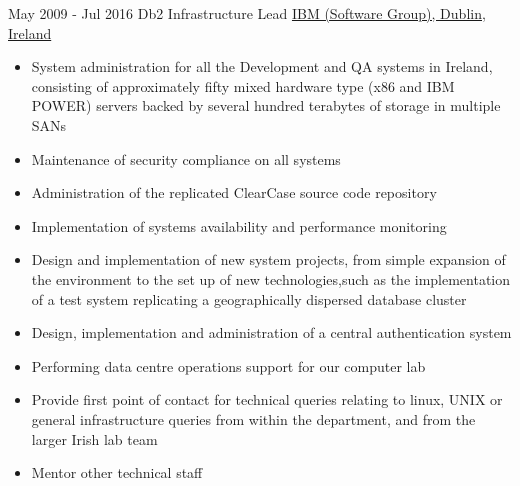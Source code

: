 \documentclass[a4paper]{tenseconds} %
\begin{document}
\begin{twenty}
{	}
	\twentyitem
	{May 2009 -}
	{Jul 2016}
	{Db2 Infrastructure Lead}
	{\href{https://www.ibm.com/db2}{IBM (Software Group), Dublin, Ireland}}
	{}
	{\begin{itemize}
		 \item System administration for all the Development and QA systems in Ireland, consisting of approximately fifty mixed hardware type (x86 and IBM POWER) servers backed by several hundred terabytes of storage in multiple SANs
		 \item Maintenance of security compliance on all systems%
		 \item Administration of the replicated ClearCase source code repository%
		 \item Implementation of systems availability and performance monitoring
		 \item Design and implementation of new system projects, from simple expansion of the environment to the set up of new technologies,such as the implementation of a test system replicating a geographically dispersed database cluster
		 \item Design, implementation and administration of a central authentication system%
		 \item Performing data centre operations support for our computer lab%
		 \item Provide first point of contact for technical queries relating to linux, UNIX or general infrastructure queries from within the department, and from the larger Irish lab team
		 \item Mentor other technical staff
	\end{itemize}}
\end{twenty}
\end{document}

